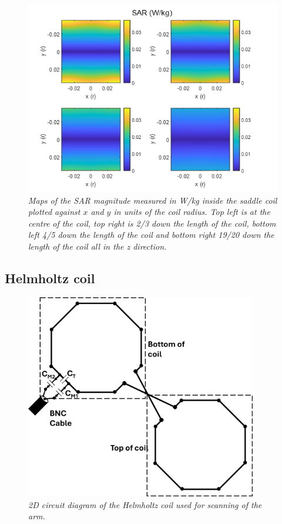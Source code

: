 \begin{figure}[H]
    \centering
    \includegraphics[width=0.9\linewidth]{Figures/Coils/Saddle_SAR.png}
    \caption{\textit{Maps of the SAR magnitude measured in W/kg inside the saddle coil plotted against $x$ and $y$ in units of the coil radius. Top left is at the centre of the coil, top right is 2/3 down the length of the coil, bottom left 4/5 down the length of the coil and bottom right 19/20 down the length of the coil all in the z direction.}}
    \label{fig:coils:Saddle_SAR}
\end{figure}

\subsection{Helmholtz coil}

\begin{figure}
    \centering
    \includegraphics[width=0.9\textwidth]{Figures/Coils/Planar_Helmholtz.png}
    \caption{\textit{2D circuit diagram of the Helmholtz coil used for scanning of the arm.}}
    \label{fig:coils:2D_Helmholtz}
\end{figure}

